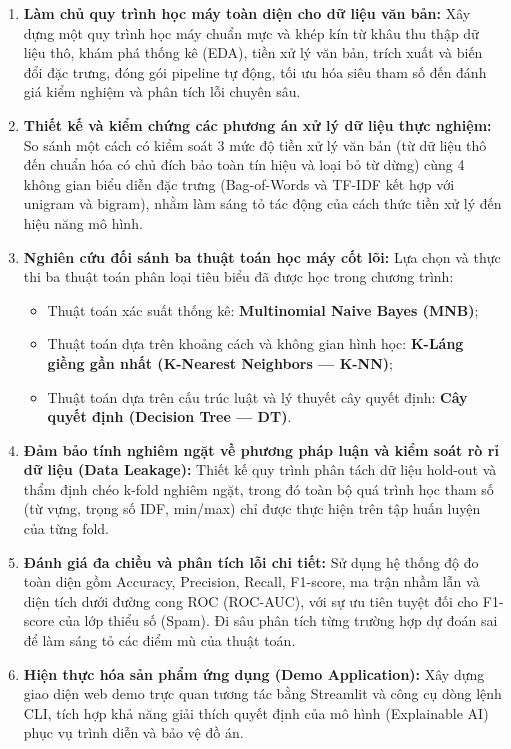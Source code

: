 \begin{enumerate}
    \item \textbf{Làm chủ quy trình học máy toàn diện cho dữ liệu văn bản:} Xây dựng một quy trình học máy chuẩn mực và khép kín từ khâu thu thập dữ liệu thô, khám phá thống kê (EDA), tiền xử lý văn bản, trích xuất và biến đổi đặc trưng, đóng gói pipeline tự động, tối ưu hóa siêu tham số đến đánh giá kiểm nghiệm và phân tích lỗi chuyên sâu.
    \item \textbf{Thiết kế và kiểm chứng các phương án xử lý dữ liệu thực nghiệm:} So sánh một cách có kiểm soát 3 mức độ tiền xử lý văn bản (từ dữ liệu thô đến chuẩn hóa có chủ đích bảo toàn tín hiệu và loại bỏ từ dừng) cùng 4 không gian biểu diễn đặc trưng (Bag-of-Words và TF-IDF kết hợp với unigram và bigram), nhằm làm sáng tỏ tác động của cách thức tiền xử lý đến hiệu năng mô hình.
    \item \textbf{Nghiên cứu đối sánh ba thuật toán học máy cốt lõi:} Lựa chọn và thực thi ba thuật toán phân loại tiêu biểu đã được học trong chương trình:
    \begin{itemize}
        \item Thuật toán xác suất thống kê: \textbf{Multinomial Naive Bayes (MNB)};
        \item Thuật toán dựa trên khoảng cách và không gian hình học: \textbf{K-Láng giềng gần nhất (K-Nearest Neighbors --- K-NN)};
        \item Thuật toán dựa trên cấu trúc luật và lý thuyết cây quyết định: \textbf{Cây quyết định (Decision Tree --- DT)}.
    \end{itemize}
    \item \textbf{Đảm bảo tính nghiêm ngặt về phương pháp luận và kiểm soát rò rỉ dữ liệu (Data Leakage):} Thiết kế quy trình phân tách dữ liệu hold-out và thẩm định chéo k-fold nghiêm ngặt, trong đó toàn bộ quá trình học tham số (từ vựng, trọng số IDF, min/max) chỉ được thực hiện trên tập huấn luyện của từng fold.
    \item \textbf{Đánh giá đa chiều và phân tích lỗi chi tiết:} Sử dụng hệ thống độ đo toàn diện gồm Accuracy, Precision, Recall, F1-score, ma trận nhầm lẫn và diện tích dưới đường cong ROC (ROC-AUC), với sự ưu tiên tuyệt đối cho F1-score của lớp thiểu số (Spam). Đi sâu phân tích từng trường hợp dự đoán sai để làm sáng tỏ các điểm mù của thuật toán.
    \item \textbf{Hiện thực hóa sản phẩm ứng dụng (Demo Application):} Xây dựng giao diện web demo trực quan tương tác bằng Streamlit và công cụ dòng lệnh CLI, tích hợp khả năng giải thích quyết định của mô hình (Explainable AI) phục vụ trình diễn và bảo vệ đồ án.
\end{enumerate}

